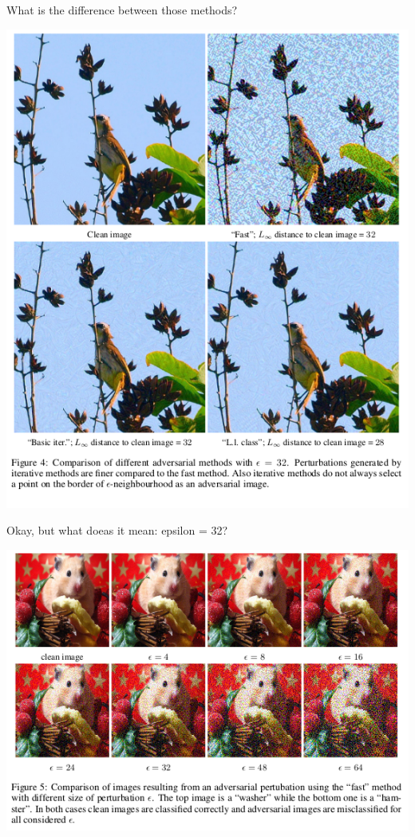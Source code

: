 \documentclass[15pt]{beamer}
\begin{document}
\begin{frame}{What is the difference between those methods?}
  \begin{center}
  \includegraphics[width=0.55\linewidth]{different_methods.png}
  \end{center}
\end{frame}

\begin{frame}{Okay, but what doeas it mean: epsilon = 32?}
  \begin{center}
  \includegraphics[width=0.8\linewidth]{epsilon.png}
  \end{center}
\end{frame}
\end{document}
